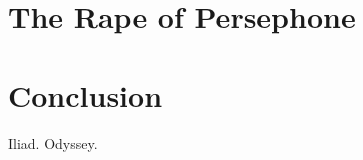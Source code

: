 \documentclass[11pt]{article}
\begin{document}


\section{The Rape of Persephone}


\section{Conclusion}


\newpage

\begin{thebibliography}{9}
		Iliad.
		Odyssey.
\end{thebibliography}
\end{document}
